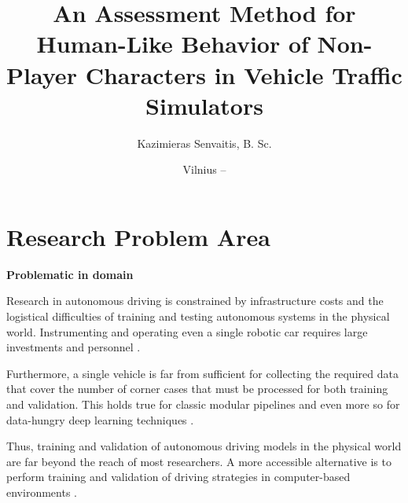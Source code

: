 \documentclass{VUMIFPS-master-intro}
\title{An Assessment Method for Human-Like Behavior of Non-Player Characters in Vehicle Traffic Simulators}
\author{Kazimieras Senvaitis, B. Sc.}
\date{Vilnius – \the\year}
\begin{document}
\maketitle




\section{Research Problem Area}

\textbf{Problematic in domain}

Research in autonomous driving is constrained by infrastructure costs and the logistical difficulties of training and testing autonomous systems in the physical world. Instrumenting and operating even a single robotic car requires large investments and personnel \cite{Dosovitskiy2017}.

Furthermore, a single vehicle is far from sufficient for collecting the required data that cover the number of corner cases that must be processed for both training and validation. This holds true for classic modular pipelines and even more so for data-hungry deep learning techniques \cite{Dosovitskiy2017}.

Thus, training and validation of autonomous driving models in the physical world are far beyond the reach of most researchers. A more accessible alternative is to perform training and validation of driving strategies in computer-based environments \cite{Dosovitskiy2017}. 


\end{document}

